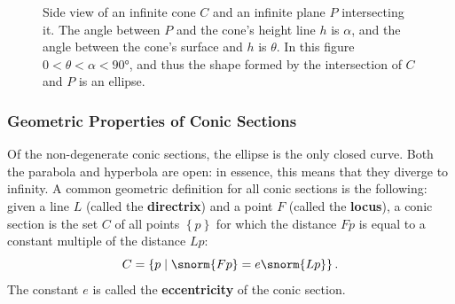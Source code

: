 \begin{figure}
  \begin{center}
  \end{center}
  \caption{Side view of an infinite cone $C$ and an infinite plane $P$ intersecting it. The angle between $P$ and the cone's height line $h$ is $\alpha$, and the angle between the cone's surface and $h$ is $\theta$. In this figure $0<\theta<\alpha<\ang{90}$, and thus the shape formed by the intersection of $C$ and $P$ is an ellipse.}
  \label{fig:cone_side_view}
\end{figure}

\subsubsection{Geometric Properties of Conic Sections}
Of the non-degenerate conic sections, the ellipse is the only closed curve. Both the parabola and hyperbola are open: in essence, this means that they diverge to infinity. A common geometric definition for all conic sections is the following: given a line $L$ (called the \textbf{directrix}) and a point $F$ (called the \textbf{locus}), a conic section is the set $C$ of all points $\left\{p\right\}$ for which the distance $Fp$ is equal to a constant multiple of the distance $Lp$:
\begin{equation}
  C = \left\{ p \mid \snorm{Fp} = e\snorm{Lp} \right\}.
  \label{eq:conic_section_geometric_definition}
\end{equation}
The constant $e$ is called the \textbf{eccentricity} of the conic section.

